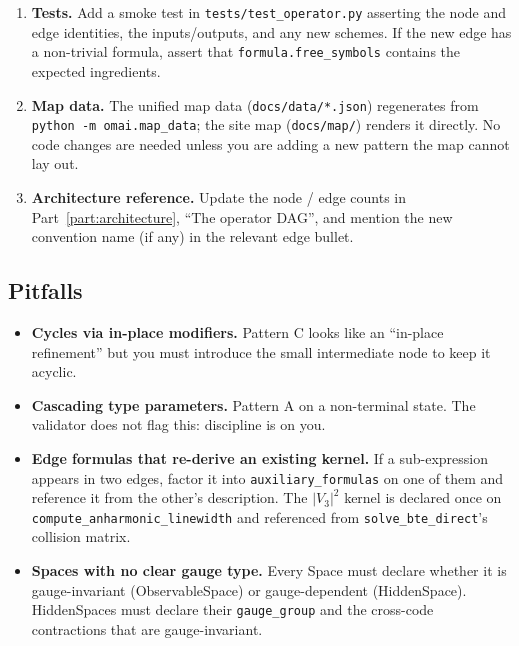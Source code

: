 \documentclass[11pt,a4paper]{article}
\begin{document}
\begin{enumerate}[leftmargin=2em]
  \item \textbf{Tests.} Add a smoke test in \texttt{tests/test\_operator.py}
        asserting the node and edge identities, the inputs/outputs, and any new
        schemes. If the new edge has a non-trivial formula, assert that
        \texttt{formula.free\_symbols} contains the expected ingredients.
  \item \textbf{Map data.} The unified map data (\texttt{docs/data/*.json})
        regenerates from \texttt{python -m omai.map\_data}; the site map
        (\texttt{docs/map/}) renders it directly. No code changes are needed
        unless you are adding a new pattern the map cannot lay out.
  \item \textbf{Architecture reference.} Update the node / edge counts in
        Part~\ref{part:architecture}, ``The operator DAG'', and mention the new
        convention name (if any) in the relevant edge bullet.
\end{enumerate}

\subsection{Pitfalls}

\begin{itemize}[leftmargin=2em]
  \item \textbf{Cycles via in-place modifiers.} Pattern C looks like an ``in-place
        refinement'' but you must introduce the small intermediate node to keep it
        acyclic.
  \item \textbf{Cascading type parameters.} Pattern A on a non-terminal state. The
        validator does not flag this: discipline is on you.
  \item \textbf{Edge formulas that re-derive an existing kernel.} If a
        sub-expression appears in two edges, factor it into
        \texttt{auxiliary\_formulas} on one of them and reference it from the
        other's description. The $|V_3|^2$ kernel is declared once on
        \texttt{compute\_anharmonic\_linewidth} and referenced from
        \texttt{solve\_bte\_direct}'s collision matrix.
  \item \textbf{Spaces with no clear gauge type.} Every Space must declare whether
        it is gauge-invariant (ObservableSpace) or gauge-dependent (HiddenSpace).
        HiddenSpaces must declare their \texttt{gauge\_group} and the cross-code
        contractions that are gauge-invariant.
\end{itemize}
\end{document}
